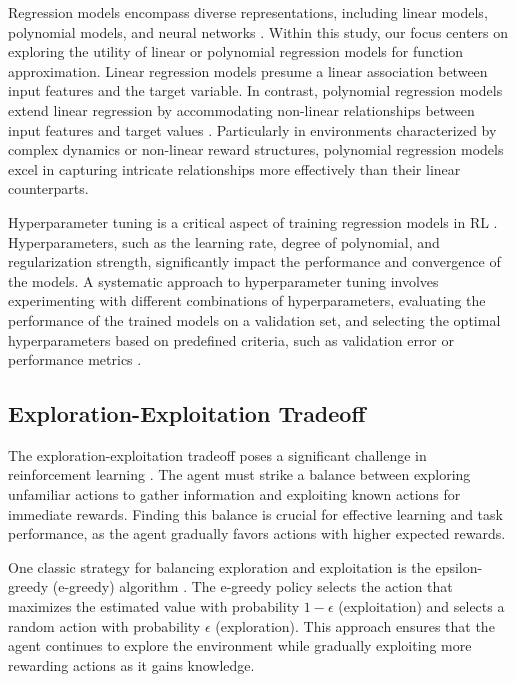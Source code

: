 Regression models encompass diverse representations, including linear models, polynomial models, and neural networks \cite{sutton2018reinforcement}. Within this study, our focus centers on exploring the utility of linear or polynomial regression models for function approximation. Linear regression models presume a linear association between input features and the target variable. In contrast, polynomial regression models extend linear regression by accommodating non-linear relationships between input features and target values \cite{IntroducReg49:online}. Particularly in environments characterized by complex dynamics or non-linear reward structures, polynomial regression models excel in capturing intricate relationships more effectively than their linear counterparts.

Hyperparameter tuning is a critical aspect of training regression models in RL \cite{bergstra2012random}. Hyperparameters, such as the learning rate, degree of polynomial, and regularization strength, significantly impact the performance and convergence of the models. A systematic approach to hyperparameter tuning involves experimenting with different combinations of hyperparameters, evaluating the performance of the trained models on a validation set, and selecting the optimal hyperparameters based on predefined criteria, such as validation error or performance metrics \cite{russel2020ai}.

\subsection{Exploration-Exploitation Tradeoff}

The exploration-exploitation tradeoff poses a significant challenge in reinforcement learning \cite{sutton2018reinforcement}. The agent must strike a balance between exploring unfamiliar actions to gather information and exploiting known actions for immediate rewards. Finding this balance is crucial for effective learning and task performance, as the agent gradually favors actions with higher expected rewards.

One classic strategy for balancing exploration and exploitation is the epsilon-greedy (e-greedy) algorithm \cite{sutton2018reinforcement}. The e-greedy policy selects the action that maximizes the estimated value with probability $1 - \epsilon$ (exploitation) and selects a random action with probability $\epsilon$ (exploration). This approach ensures that the agent continues to explore the environment while gradually exploiting more rewarding actions as it gains knowledge.

